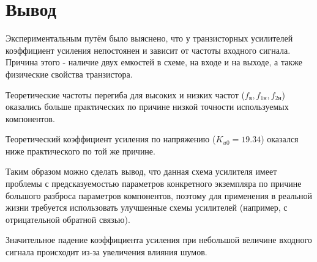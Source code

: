 \section{Вывод}
Экспериментальным путём было выяснено, что у транзисторных усилителей коэффициент усиления непостоянен и зависит от частоты входного сигнала. Причина этого - наличие двух емкостей в схеме, на входе и на выходе, а также физические свойства транзистора.

Теоретические частоты перегиба для высоких и низких частот ($f_в, f_{1н}, f_{2н}$) оказались больше практических по причине низкой точности используемых компонентов.

Теоретический коэффициент усиления по напряжению ($K_{u0}=19.34$) оказался ниже практического по той же причине. 

Таким образом можно сделать вывод, что данная схема усилителя имеет проблемы с предсказуемостью параметров конкретного экземпляра по причине большого разброса параметров компонентов, поэтому для применения в реальной жизни требуется использовать улучшенные схемы усилителей (например, с отрицательной обратной связью).

Значительное падение коэффициента усиления при небольшой величине входного сигнала происходит из-за увеличения влияния шумов.